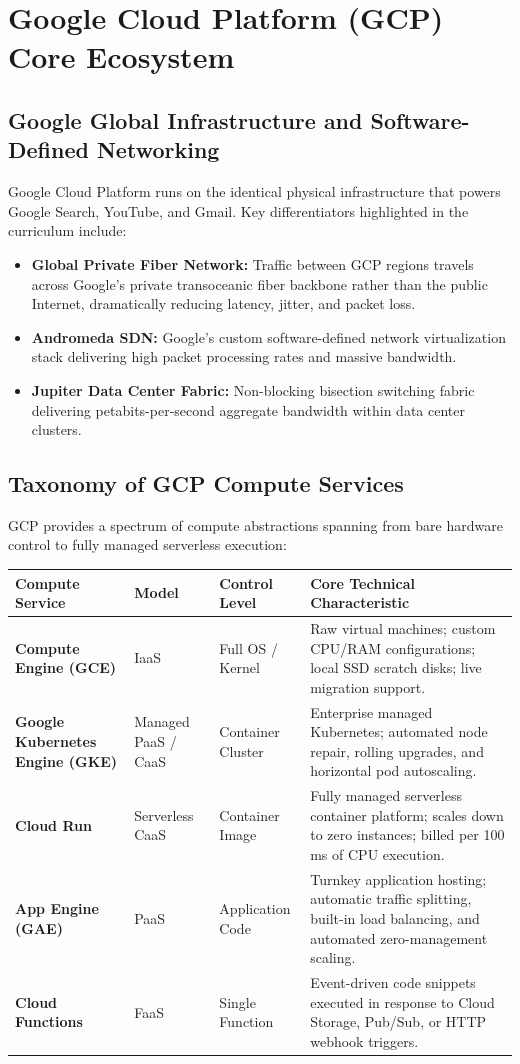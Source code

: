 \section{Google Cloud Platform (GCP) Core Ecosystem}
\subsection{Google Global Infrastructure and Software-Defined Networking}
Google Cloud Platform runs on the identical physical infrastructure that powers Google Search, YouTube, and Gmail. Key differentiators highlighted in the curriculum include:
\begin{itemize}[leftmargin=*]
  \item \textbf{Global Private Fiber Network:} Traffic between GCP regions travels across Google's private transoceanic fiber backbone rather than the public Internet, dramatically reducing latency, jitter, and packet loss.
  \item \textbf{Andromeda SDN:} Google's custom software-defined network virtualization stack delivering high packet processing rates and massive bandwidth.
  \item \textbf{Jupiter Data Center Fabric:} Non-blocking bisection switching fabric delivering petabits-per-second aggregate bandwidth within data center clusters.
\end{itemize}

\subsection{Taxonomy of GCP Compute Services}
GCP provides a spectrum of compute abstractions spanning from bare hardware control to fully managed serverless execution:
\begin{center}
\begin{tabularx}{\textwidth}{>{\bfseries}l p{2.2cm} p{2.5cm} X}
\toprule
Compute Service & Model & Control Level & Core Technical Characteristic\\
\midrule
Compute Engine (GCE) & IaaS & Full OS / Kernel & Raw virtual machines; custom CPU/RAM configurations; local SSD scratch disks; live migration support.\\
Google Kubernetes Engine (GKE) & Managed PaaS / CaaS & Container Cluster & Enterprise managed Kubernetes; automated node repair, rolling upgrades, and horizontal pod autoscaling.\\
Cloud Run & Serverless CaaS & Container Image & Fully managed serverless container platform; scales down to zero instances; billed per 100 ms of CPU execution.\\
App Engine (GAE) & PaaS & Application Code & Turnkey application hosting; automatic traffic splitting, built-in load balancing, and automated zero-management scaling.\\
Cloud Functions & FaaS & Single Function & Event-driven code snippets executed in response to Cloud Storage, Pub/Sub, or HTTP webhook triggers.\\
\bottomrule
\end{tabularx}
\end{center}

